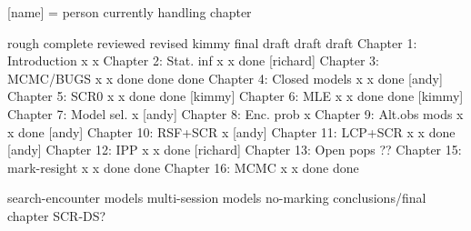 [name] = person currently handling chapter


                          rough   complete reviewed  revised kimmy       final draft
                          draft    draft
Chapter 1: Introduction       x       x
Chapter 2: Stat. inf          x       x     done    [richard]
Chapter 3: MCMC/BUGS          x       x     done     done    done
Chapter 4: Closed models      x       x     done    [andy]
Chapter 5: SCR0               x       x     done     done   [kimmy]
Chapter 6: MLE                x       x     done     done   [kimmy]
Chapter 7: Model sel.         x     [andy]
Chapter 8: Enc. prob          x      
Chapter 9: Alt.obs mods       x       x     done    [andy] 
Chapter 10: RSF+SCR           x    [andy]
Chapter 11: LCP+SCR           x       x     done    [andy]
Chapter 12: IPP               x       x     done    [richard]
Chapter 13: Open pops        ??
Chapter 15: mark-resight      x       x     done     done 
Chapter 16: MCMC              x       x     done     done


search-encounter models
multi-session models
no-marking 
conclusions/final chapter
SCR-DS?


